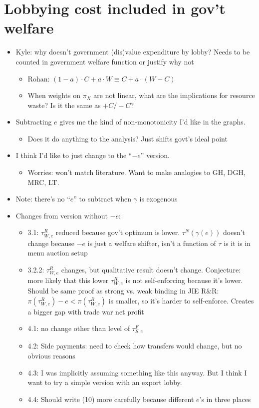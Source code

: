 \documentclass[12pt]{article}
\newcommand{\ga}{\gamma}
\begin{document}
\section{Lobbying cost included in gov't welfare}
	\begin{itemize}
		\item Kyle: why doesn't government (dis)value expenditure by lobby? Needs to be counted in government welfare function or justify why not
			\begin{itemize}
				\item Rohan: $(1-a)\cdot C + a \cdot W \equiv C + a \cdot (W-C)$
				\item When weights on $\pi_X$ are not linear, what are the implications for resource waste? Is it the same as $+ C / - C$?
			\end{itemize}
		\item Subtracting $e$ gives me the kind of non-monotonicity I'd like in the graphs.
			\begin{itemize}
				\item Does it do anything to the analysis? Just shifts govt's ideal point
			\end{itemize}
		\item I think I'd like to just change to the ``$-e$'' version.
			\begin{itemize}
				\item Worries: won't match literature. Want to make analogies to GH, DGH, MRC, LT.
			\end{itemize}
		\item Note: there's no ``$e$'' to subtract when $\ga$ is exogenous
		\item Changes from version without $-e$:
			\begin{itemize}
				\item 3.1: $\tau_{W,e}^R$ reduced because gov't optimum is lower. $\tau^N(\ga(e))$ doesn't change because $-e$ is just a welfare shifter, isn't a function of $\tau$ is it is in menu auction setup
				\item 3.2.2: $\tau_{W,e}^R$ changes, but qualitative result doesn't change. Conjecture: more likely that this lower $\tau_{W,e}^R$ is not self-enforcing because it's lower. Should be same proof as strong vs. weak binding in JIE R$\&$R: $\pi(\tau_{W,e}^R) - e < \pi(\tau_{W,e}^R)$ is smaller, so it's harder to self-enforce. Creates a bigger gap with trade war net profit 
				\item 4.1: no change other than level of $\tau_{S,e}^F$
				\item 4.2: Side payments: need to check how transfers would change, but no obvious reasons
				\item 4.3: I was implicitly assuming something like this anyway. But I think I want to try a simple version with an export lobby.
				\item 4.4: Should write (10) more carefully because different $e$'s in three places
			\end{itemize}
	\end{itemize}
\end{document}
